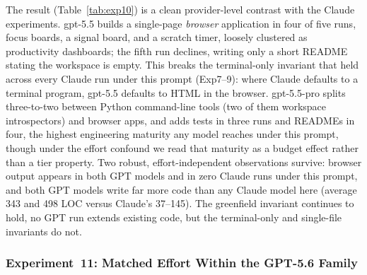 \documentclass{article}
\begin{document}
The result (Table~\ref{tab:exp10}) is a clean provider-level
contrast with the Claude experiments. gpt-5.5 builds a
single-page \emph{browser} application in four of five runs,
focus boards, a signal board, and a scratch timer, loosely
clustered as productivity dashboards; the fifth run declines,
writing only a short README stating the workspace is empty. This
breaks the terminal-only invariant that held across every Claude
run under this prompt (Exp7--9): where Claude defaults to a
terminal program, gpt-5.5 defaults to HTML in the browser.
gpt-5.5-pro splits three-to-two between Python command-line tools
(two of them workspace introspectors) and browser apps, and adds
tests in three runs and READMEs in four, the highest engineering
maturity any model reaches under this prompt, though under the
effort confound we read that maturity as a budget effect rather
than a tier property. Two robust, effort-independent observations
survive: browser output appears in both GPT models and in zero
Claude runs under this prompt, and both GPT models write far more
code than any Claude model here (average 343 and 498 LOC versus
Claude's 37--145). The greenfield invariant continues to hold, no
GPT run extends existing code, but the terminal-only and
single-file invariants do not.

\begin{table}[t]
\caption{Experiment~10: Prompt~5 (``Just do something you
  want.'') on the Codex backend. Reasoning effort differs by model
  (gpt-5.5-pro rejects \texttt{low}), so tier and effort are
  confounded; gpt-5.5-pro is indicative, not a tier comparison.
  gpt-5.5 LOC is averaged over its four implementing runs (the
  fifth declined).}
\label{tab:exp10}
\small{}
\end{table}

\subsubsection{Experiment~11: Matched Effort Within the GPT-5.6 Family}
\label{sec:exp11}
\end{document}
